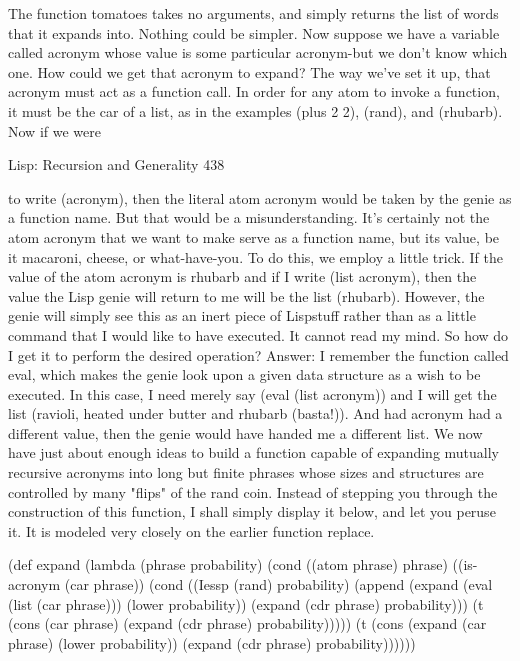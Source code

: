         The function tomatoes takes no arguments, and simply returns the list of
words that it expands into. Nothing could be simpler.
        Now suppose we have a variable called acronym whose value is some
particular acronym-but we don't know which one. How could we get that acronym to
expand? The way we've set it up, that acronym must act as a function call. In order for
any atom to invoke a function, it must be the car of a list, as in the examples (plus 2
2), (rand), and (rhubarb). Now if we were




Lisp: Recursion and Generality                                                       438

to write (acronym), then the literal atom acronym would be taken by the genie as a
function name. But that would be a misunderstanding. It's certainly not the atom
acronym that we want to make serve as a function name, but its value, be it
macaroni, cheese, or what-have-you.
        To do this, we employ a little trick. If the value of the atom acronym is
rhubarb and if I write (list acronym), then the value the Lisp genie will return to me
will be the list (rhubarb). However, the genie will simply see this as an inert piece of
Lispstuff rather than as a little command that I would like to have executed. It cannot
read my mind. So how do I get it to perform the desired operation? Answer: I
remember the function called eval, which makes the genie look upon a given data
structure as a wish to be executed. In this case, I need merely say (eval (list
acronym)) and I will get the list (ravioli, heated under butter and rhubarb
(basta!)). And had acronym had a different value, then the genie would have handed
me a different list.
        We now have just about enough ideas to build a function capable of expanding
mutually recursive acronyms into long but finite phrases whose sizes and structures
are controlled by many "flips" of the rand coin. Instead of stepping you through the
construction of this function, I shall simply display it below, and let you peruse it. It is
modeled very closely on the earlier function replace.

(def expand (lambda (phrase probability)
       (cond ((atom phrase) phrase)
              ((is-acronym (car phrase))
              (cond ((Iessp (rand) probability)
                       (append
                       (expand (eval (list (car phrase))) (lower probability))
                       (expand (cdr phrase) probability)))
                    (t
                       (cons (car phrase) (expand (cdr phrase) probability)))))
              (t (cons (expand (car phrase) (lower probability))
                       (expand (cdr phrase) probability))))))

